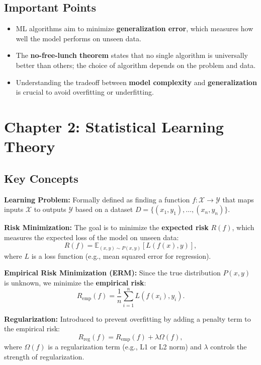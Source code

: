 \begin{notechapter}
\subsection{Important Points}
\begin{itemize}
    \item ML algorithms aim to minimize \textbf{generalization error}, which measures how well the model performs on unseen data.
    \item The \textbf{no-free-lunch theorem} states that no single algorithm is universally better than others; the choice of algorithm depends on the problem and data.
    \item Understanding the tradeoff between \textbf{model complexity} and \textbf{generalization} is crucial to avoid overfitting or underfitting.
\end{itemize}

\section{Chapter 2: Statistical Learning Theory}

\subsection{Key Concepts}
\textbf{Learning Problem:} Formally defined as finding a function \( f: \mathcal{X} \rightarrow \mathcal{Y} \) that maps inputs \( \mathcal{X} \) to outputs \( \mathcal{Y} \) based on a dataset \( D = \{(x_1, y_1), \dots, (x_n, y_n)\} \).

\vspace{0.5em}
\textbf{Risk Minimization:} The goal is to minimize the \textbf{expected risk} \( R(f) \), which measures the expected loss of the model on unseen data:
\[
R(f) = \mathbb{E}_{(x,y) \sim P(x,y)}[L(f(x), y)],
\]
where \( L \) is a loss function (e.g., mean squared error for regression).

\vspace{0.5em}
\textbf{Empirical Risk Minimization (ERM):} Since the true distribution \( P(x,y) \) is unknown, we minimize the \textbf{empirical risk}:
\[
R_{\text{emp}}(f) = \frac{1}{n} \sum_{i=1}^n L(f(x_i), y_i).
\]

\vspace{0.5em}
\textbf{Regularization:} Introduced to prevent overfitting by adding a penalty term to the empirical risk:
\[
R_{\text{reg}}(f) = R_{\text{emp}}(f) + \lambda \Omega(f),
\]
where \( \Omega(f) \) is a regularization term (e.g., L1 or L2 norm) and \( \lambda \) controls the strength of regularization.


\end{notechapter}
